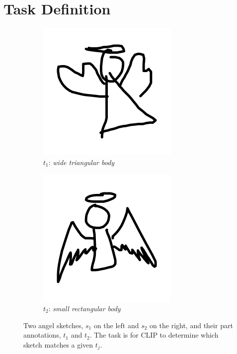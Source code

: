 \section{Task Definition} \label{modeling.task.def}
\begin{figure}[!htb]
\begin{subfigure}{0.5\textwidth}
    \centering
    \includegraphics[width=0.5\linewidth]{modeling/angel340.png}
    \caption{$t_1$: \textit{wide triangular body}}
    \label{modeling.task.sketches.1}  
\end{subfigure}
\begin{subfigure}{0.5\textwidth}
    \centering
    \includegraphics[width=0.5\linewidth]{modeling/angel389.png}   
    \caption{$t_2$: \textit{small rectangular body}}
    \label{modeling.task.sketches.2}  
\end{subfigure}
\caption{Two angel sketches, $s_1$ on the left and $s_2$ on the right, and their part annotations, $t_1$ and $t_2$. The task is for CLIP to determine which sketch matches a given $t_j$.}
\label{modeling.task.sketches}
\end{figure}

